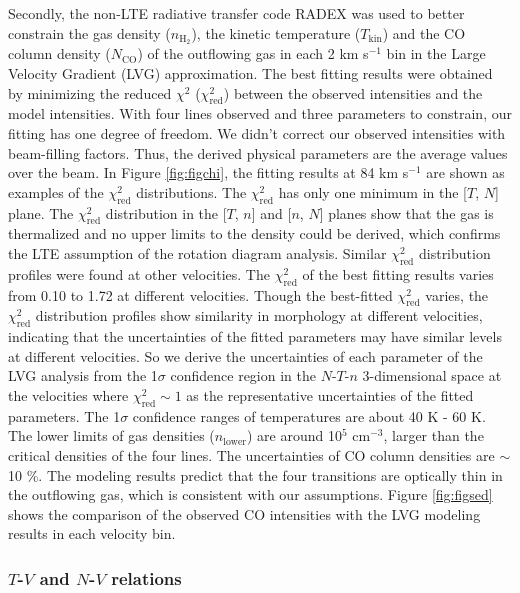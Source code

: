 Secondly, the non-LTE radiative transfer code RADEX \citep{2007A&A...468..627V} was used to better constrain the gas density ($n_{\mathrm{H}_2}$), the kinetic temperature ($T_{\mathrm{kin}}$) and the CO column density ($N_{\mathrm{CO}}$) of the outflowing gas in each 2 km s$^{-1}$ bin in the Large Velocity Gradient (LVG) approximation. The best fitting results were obtained by minimizing the reduced $\chi^2$ ($\chi^2_{\mathrm{red}}$) between the observed intensities and the model intensities. With four lines observed and three parameters to constrain, our fitting has one degree of freedom. We didn't correct our observed intensities with beam-filling factors. Thus, the derived physical parameters are the average values over the beam.  In Figure \ref{fig:figchi}, the fitting results at 84 km s$^{-1}$ are shown as examples of the $\chi^2_{\mathrm{red}}$ distributions. The $\chi^2_{\mathrm{red}}$ has only one minimum in the [$T$, $N$] plane. The $\chi^2_{\mathrm{red}}$ distribution in the [$T$, $n$] and [$n$, $N$] planes show that the gas is thermalized and no upper limits to the density could be derived, which confirms the LTE assumption of the rotation diagram analysis. Similar $\chi^2_{\mathrm{red}}$ distribution profiles were found at other velocities. The $\chi^2_{\mathrm{red}}$ of the best fitting results varies from 0.10 to 1.72 at different velocities. Though the best-fitted $\chi^2_{\mathrm{red}}$ varies, the $\chi^2_{\mathrm{red}}$ distribution profiles show similarity in morphology at different velocities, indicating that the uncertainties of the fitted parameters may have similar levels at different velocities. So we derive the uncertainties of each parameter of the LVG analysis from the 1$\sigma$ confidence region in the $N$-$T$-$n$ 3-dimensional space at the velocities where $\chi^2_{\mathrm{red}} \sim 1$ as the representative uncertainties of the fitted parameters. The 1$\sigma$ confidence ranges of temperatures are about 40 K - 60 K. The lower limits of gas densities ($n_{\mathrm{lower}}$) are around 10$^5$ cm$^{-3}$, larger than the critical densities of the four lines. The uncertainties of CO column densities are $\sim$ 10 \%. The modeling results predict that the four transitions are optically thin in the outflowing gas, which is consistent with our assumptions. Figure \ref{fig:figsed} shows the comparison of the observed CO intensities with the LVG modeling results in each velocity bin. 

\subsubsection{$T$-$V$ and $N$-$V$ relations}

